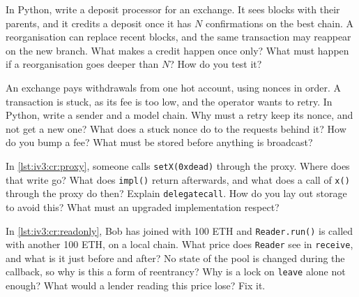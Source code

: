 \begin{question}\label{iq:iv3:smart-contracts-and-crypto-engineering:20}
In Python, write a deposit processor for an exchange. It sees blocks with their parents, and it credits a deposit once it has $N$ confirmations on the best chain. A reorganisation can replace recent blocks, and the same transaction may reappear on the new branch. What makes a credit happen once only? What must happen if a reorganisation goes deeper than $N$? How do you test it?
\end{question}

\begin{question}\label{iq:iv3:smart-contracts-and-crypto-engineering:21}
An exchange pays withdrawals from one hot account, using nonces in order. A transaction is stuck, as its fee is too low, and the operator wants to retry. In Python, write a sender and a model chain. Why must a retry keep its nonce, and not get a new one? What does a stuck nonce do to the requests behind it? How do you bump a fee? What must be stored before anything is broadcast?
\end{question}

\begin{question}\label{iq:iv3:smart-contracts-and-crypto-engineering:22}
In \cref{lst:iv3:cr:proxy}, someone calls \texttt{setX(0xdead)} through the proxy. Where does that write go? What does \texttt{impl()} return afterwards, and what does a call of \texttt{x()} through the proxy do then? Explain \texttt{delegatecall}. How do you lay out storage to avoid this? What must an upgraded implementation respect?
\label{lst:iv3:cr:proxy}
\end{question}

\begin{question}\label{iq:iv3:smart-contracts-and-crypto-engineering:23}
In \cref{lst:iv3:cr:readonly}, Bob has joined with 100 ETH and \texttt{Reader.run()} is called with another 100 ETH, on a local chain. What price does \texttt{Reader} see in \texttt{receive}, and what is it just before and after? No state of the pool is changed during the callback, so why is this a form of reentrancy? Why is a lock on \texttt{leave} alone not enough? What would a lender reading this price lose? Fix it.
\label{lst:iv3:cr:readonly}
\end{question}


